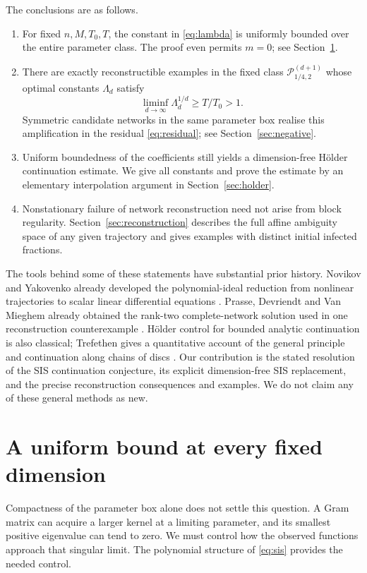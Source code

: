 The conclusions are as follows.
\begin{enumerate}
 \item For fixed $n,M,T_0,T$, the constant in \eqref{eq:lambda} is uniformly bounded over the entire parameter class. The proof even permits $m=0$; see Section~\ref{sec:fixed}.
 \item There are exactly reconstructible examples in the fixed class $\mathcal P_{1/4,2}^{(d+1)}$ whose optimal constants $\Lambda_d$ satisfy
 \[
   \liminf_{d\to\infty}\Lambda_d^{1/d}\geq T/T_0>1.
 \]
 Symmetric candidate networks in the same parameter box realise this amplification in the residual \eqref{eq:residual}; see Section~\ref{sec:negative}.
 \item Uniform boundedness of the coefficients still yields a dimension-free Hölder continuation estimate. We give all constants and prove the estimate by an elementary interpolation argument in Section~\ref{sec:holder}.
 \item Nonstationary failure of network reconstruction need not arise from block regularity. Section~\ref{sec:reconstruction} describes the full affine ambiguity space of any given trajectory and gives examples with distinct initial infected fractions.
\end{enumerate}

The tools behind some of these statements have substantial prior history. Novikov and Yakovenko already developed the polynomial-ideal reduction from nonlinear trajectories to scalar linear differential equations \cite[Sections 2.2--2.3]{NY1999}. Prasse, Devriendt and Van Mieghem already obtained the rank-two complete-network solution used in one reconstruction counterexample \cite[Theorem 4]{PDM2021}. Hölder control for bounded analytic continuation is also classical; Trefethen gives a quantitative account of the general principle and continuation along chains of discs \cite{T2020}. Our contribution is the stated resolution of the SIS continuation conjecture, its explicit dimension-free SIS replacement, and the precise reconstruction consequences and examples. We do not claim any of these general methods as new.

\section{A uniform bound at every fixed dimension}
\label{sec:fixed}

Compactness of the parameter box alone does not settle this question. A Gram matrix can acquire a larger kernel at a limiting parameter, and its smallest positive eigenvalue can tend to zero. We must control how the observed functions approach that singular limit. The polynomial structure of \eqref{eq:sis} provides the needed control.

